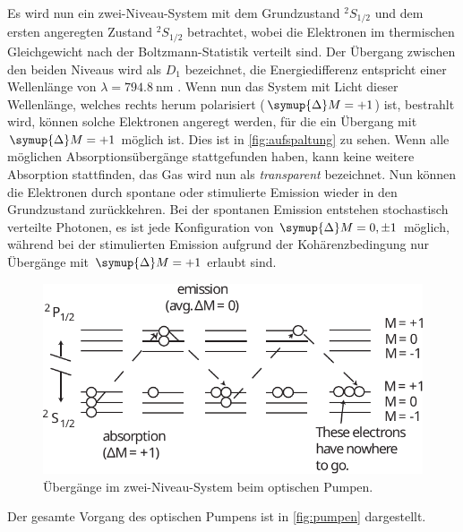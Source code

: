     Es wird nun ein zwei-Niveau-System mit dem Grundzustand $^2S_{1/2}$ und dem ersten angeregten Zustand $^2S_{1/2}$ betrachtet,
    wobei die Elektronen im thermischen Gleichgewicht nach der Boltzmann-Statistik verteilt sind.
    Der Übergang zwischen den beiden Niveaus wird als $D_1$ bezeichnet,
    die Energiedifferenz entspricht einer Wellenlänge von $\lambda = \SI{794.8}{\nano\meter}$ \cite{versuchsanleitung}.
    Wenn nun das System mit Licht dieser Wellenlänge,
    welches rechts herum polarisiert ($\symup{\Delta}M = +1$) ist,
    bestrahlt wird,
    können solche Elektronen angeregt werden,
    für die ein Übergang mit $\symup{\Delta}M = +1$ möglich ist.
    Dies ist in \autoref{fig:aufspaltung} zu sehen.
    Wenn alle möglichen Absorptionsübergänge stattgefunden haben,
    kann keine weitere Absorption stattfinden,
    das Gas wird nun als \textit{transparent} bezeichnet.
    Nun können die Elektronen durch spontane oder stimulierte Emission wieder in den Grundzustand zurückkehren.
    Bei der spontanen Emission entstehen stochastisch verteilte Photonen,
    es ist jede Konfiguration von $\symup{\Delta}M = 0, \pm 1$ möglich,
    während bei der stimulierten Emission aufgrund der Kohärenzbedingung nur Übergänge mit $\symup{\Delta}M = +1$ erlaubt sind.
    \begin{figure}[H]
        \centering
        \includegraphics[scale=0.8]{content/img/Lit2_Abb_8.pdf}
        \caption{Übergänge im zwei-Niveau-System beim optischen Pumpen. \cite{caltech}}
        \label{fig:pumpen}
    \end{figure}
    Der gesamte Vorgang des optischen Pumpens ist in \autoref{fig:pumpen} dargestellt.





